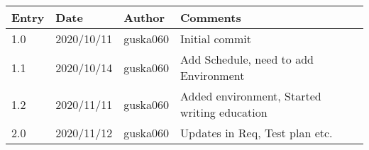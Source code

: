 \begin{tabular}{ |p{3cm}|p{3cm}|p{3cm}|p{3cm}|  }
 

 \hline
 Entry & Date & Author &Comments \\
 \hline
 1.0   & 2020/10/11  &guska060 &  Initial commit\\
 

 \hline
 1.1   & 2020/10/14  &guska060 & Add Schedule, need to add Environment\\
 
 \hline
 1.2   & 2020/11/11  &guska060 & Added environment, Started writing education\\
 
 \hline
 2.0   & 2020/11/12  &guska060 & Updates in Req, Test plan etc.\\
 
 \hline
\end{tabular}